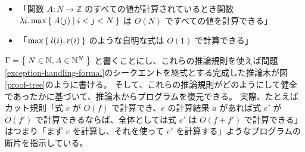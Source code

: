 \documentclass{ltjsarticle}
\begin{document}
\begin{itemize}
    \item 「関数 $A : N \to \mathbb{Z}$ のすべての値が計算されているとき関数 $\lambda i. \max \Set{ A(j) | i < j < N }$ は $O(N)$ ですべての値を計算できる」
        \begin{center}
            \begin{prooftree}
            \end{prooftree}
        \end{center}

    \item 「$\max \Set{ l(i), r(i) }$ のような自明な式は $O(1)$ で計算できる」
        \begin{center}
            \begin{prooftree}
            \end{prooftree}
        \end{center}

\end{itemize}

$\Gamma = \Set{ N \in \mathbb{N}, A \in \mathbb{N}^N }$ と書くことにし、これらの推論規則を使えば問題\ref{exception-handling-formal}のシークエントを終式とする完成した推論木が図\ref{proof-tree}のように書ける。
そして、これらの推論規則がどのようにして健全であったかに基づいて、推論木からプログラムを復元できる。
実際、たとえばカット規則「式 $e$ が $O(f)$ で計算でき、$e$ の計算結果 $a$ があれば式 $e'$ が $O(f')$ で計算できるならば、全体としては式 $e'$ は $O(f + f')$ で計算できる」はつまり「まず $e$ を計算し、それを使って $e'$ を計算する」ようなプログラムの断片を指示している。
\end{document}
